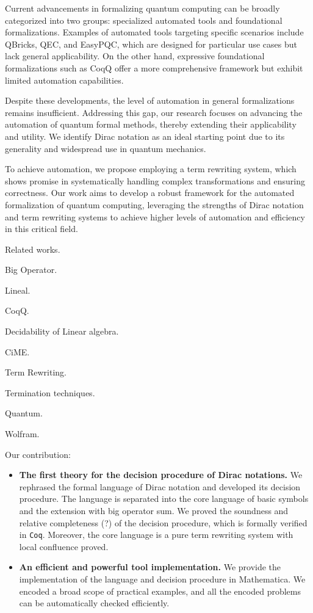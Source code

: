 \documentclass[manuscript, review, timestamp]{acmart}
\begin{document}
Current advancements in formalizing quantum computing can be broadly categorized into two groups: specialized automated tools and foundational formalizations. Examples of automated tools targeting specific scenarios include QBricks, QEC, and EasyPQC, which are designed for particular use cases but lack general applicability. On the other hand, expressive foundational formalizations such as CoqQ offer a more comprehensive framework but exhibit limited automation capabilities.

Despite these developments, the level of automation in general formalizations remains insufficient. Addressing this gap, our research focuses on advancing the automation of quantum formal methods, thereby extending their applicability and utility. We identify Dirac notation as an ideal starting point due to its generality and widespread use in quantum mechanics.

To achieve automation, we propose employing a term rewriting system, which shows promise in systematically handling complex transformations and ensuring correctness. Our work aims to develop a robust framework for the automated formalization of quantum computing, leveraging the strengths of Dirac notation and term rewriting systems to achieve higher levels of automation and efficiency in this critical field.


Related works.

Big Operator.\cite{Bertot2008}

Lineal.\cite{Arrighi2017}

CoqQ.\cite{Zhou2022}

Decidability of Linear algebra.\cite{Solovay2012}

CiME.\cite{Contejean2011}

Term Rewriting. \cite{Baader1998}

Termination techniques. \cite{Arts2000} \cite{Giesl2002} \cite{Giesl2006}

Quantum. \cite{Nielsen2010}

Wolfram. \cite{WolframLanguage}

\vspace{2em}

Our contribution:
\begin{itemize}
  \item \textbf{The first theory for the decision procedure of Dirac notations.} 
  We rephrased the formal language of Dirac notation and developed its decision procedure. The language is separated into the core language of basic symbols and the extension with big operator sum. We proved the soundness and relative completeness (?) of the decision procedure, which is formally verified in \texttt{Coq}. Moreover, the core language is a pure term rewriting system with local confluence proved.
  \item \textbf{An efficient and powerful tool implementation.}
  We provide the implementation of the language and decision procedure in Mathematica. We encoded a broad scope of practical examples, and all the encoded problems can be automatically checked efficiently.
\end{itemize}
\end{document}
